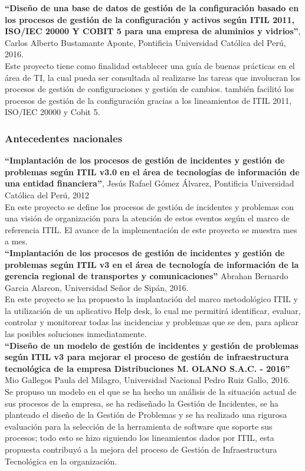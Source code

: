 \textbf{``Diseño de una base de datos de gestión de la configuración basado en los procesos de gestión de la configuración y activos según ITIL 2011, ISO/IEC 20000 Y COBIT 5 para una empresa de aluminios y vidrios''}, Carlos Alberto Bustamante Aponte, Pontificia Universidad Católica del Perú, 2016.\\[2pt]
Este proyecto tiene como finalidad establecer una guía de buenas prácticas en el área de TI, la cual pueda ser consultada al realizarse las tareas que involucran los procesos de gestión de configuraciones y gestión de cambios. también facilitó los procesos de gestión de la configuración gracias a los lineamientos de ITIL 2011, ISO/IEC 20000 y Cobit 5.

\subsubsection{Antecedentes nacionales}
\textbf{``Implantación de los procesos de gestión de incidentes y gestión de problemas según ITIL v3.0 en el área de tecnologías de información de una entidad financiera''}, Jesús Rafael Gómez Álvarez, Pontificia Universidad Católica del Perú, 2012\\[2pt]
En este proyecto se define los procesos de gestión de incidentes y problemas con una visión de organización para la atención de estos eventos según el marco de referencia ITIL. El avance de la implementación de este proyecto se muestra mes a mes.\\

\textbf{``Implantación de los procesos de gestión de incidentes y gestión de problemas según ITIL v3 en el área de tecnología de información de la gerencia regional de transportes y comunicaciones''} Abrahan Bernardo Garcia Alarcon, Universidad Señor de Sipán, 2016.\\[2pt]
En este proyecto se ha propuesto la implantación del marco metodológico ITIL y la utilización de un aplicativo Help desk, lo cual me permitirá identificar, evaluar, controlar y monitorear todas las incidencias y problemas que se den, para aplicar las posibles soluciones inmediatamente.\\

\textbf{``Diseño de un modelo de gestión de incidentes y gestión de problemas según ITIL v3 para mejorar el proceso de gestión de infraestructura tecnológica de la empresa Distribuciones M. OLANO S.A.C. - 2016''} Mio Gallegos Paula del Milagro, Universidad Nacional Pedro Ruiz Gallo, 2016.\\[2pt]
Se propuso un modelo en el que se ha hecho un análisis de la situación actual de sus procesos de la empresa, se ha rediseñado la Gestión de Incidentes, se ha planteado el diseño de la Gestión de Problemas y se ha realizado una rigurosa evaluación para la selección de la herramienta de software que soporte sus procesos; todo esto se hizo siguiendo los lineamientos dados por ITIL, esta propuesta contribuyó a la mejora del proceso de Gestión de Infraestructura Tecnológica en la organización.

